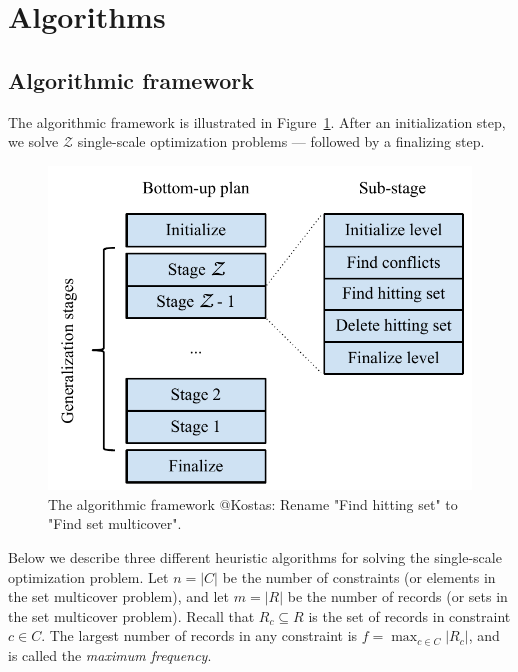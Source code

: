 \section{Algorithms}
\label{sec:algorithms}

\subsection{Algorithmic framework}

The algorithmic framework is illustrated in Figure~\ref{fig:algorithmic-framework}. After an initialization step, we solve $\mathcal{Z}$ single-scale optimization problems --- followed by a finalizing step.

\begin{figure}[htbp]
\begin{center}
\includegraphics[scale=.7]{figs/cvl_stages.pdf}
\caption{The algorithmic framework @Kostas: Rename "Find hitting set" to "Find set multicover".}
\label{fig:algorithmic-framework}
\end{center}
\end{figure}

Below we describe three different heuristic algorithms for solving the single-scale optimization problem. Let $n=|C|$ be the number of constraints (or elements in the set multicover problem), and let $m=|R|$ be the number of records (or sets in the set multicover problem). Recall that $R_c \subseteq R$ is the set of records in constraint $c \in C$. The largest number of records in any constraint is $f = \max_{c \in C} |R_c|$, and is called the \emph{maximum frequency}.

